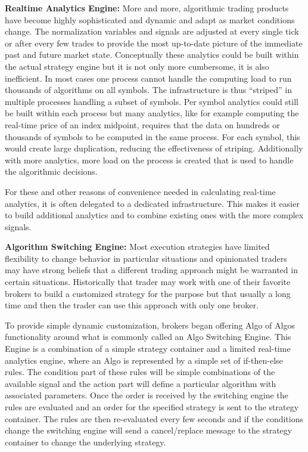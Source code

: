 \noindent\textbf{Realtime Analytics Engine:} More and more, algorithmic trading products have become highly sophisticated and dynamic and adapt as market conditions change. The normalization variables and signals are adjusted at every single tick or after every few trades to provide the most up-to-date picture of the immediate past and future market state. Conceptually these analytics could be built within the actual strategy engine but it is not only more cumbersome, it is also inefficient. In most cases one process cannot handle the computing load to run thousands of algorithms on all symbols. The infrastructure is thus ``striped'' in multiple processes handling a subset of symbols. Per symbol analytics could still be built within each process but many analytics, like for example computing the real-time price of an index midpoint, requires that the data on hundreds or thousands of symbols to be computed in the same process. For each symbol, this would create large duplication, reducing the effectiveness of striping. Additionally with more analytics, more load on the process is created that is used to handle the algorithmic decisions.


For these and other reasons of convenience needed in calculating real-time analytics, it is often delegated to a dedicated infrastructure. This makes it easier to build additional analytics and to combine existing ones with the more complex signals. \twomedskip


\noindent\textbf{Algorithm Switching Engine:} Most execution strategies have limited flexibility to change behavior in particular situations and opinionated traders may have strong beliefs that a different trading approach might be warranted in certain situations. Historically that trader may work with one of their favorite brokers to build a customized strategy for the purpose but that usually a long time and then the trader can use this approach with only one broker. 


To provide simple dynamic customization, brokers began offering Algo of Algos functionality around what is commonly called an Algo Switching Engine. This Engine is a combination of a simple strategy container and a limited real-time analytics engine, where an Algo is represented by a simple set of if-then-else rules. The condition  part of these rules will be simple combinations of the available signal and the action part will define a particular algorithm with associated parameters. Once the order is received by the switching engine the rules are evaluated and an order for the specified strategy is sent to the strategy container. The rules are then re-evaluated every few seconds and if the conditions change the switching engine will send a cancel/replace message to the strategy container to change the underlying strategy. \twomedskip


